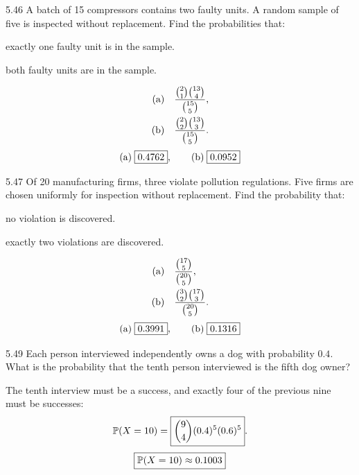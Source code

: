 \documentclass[11pt,oneside]{article}
\begin{document}
\begin{exercise}{5.46}
A batch of 15 compressors contains two faulty units. A random sample of five is inspected without replacement. Find the probabilities that:
\begin{exercisesubparts}
\item exactly one faulty unit is in the sample.
\item both faulty units are in the sample.
\end{exercisesubparts}
\end{exercise}

\begin{solution}
\begin{align*}
\textup{(a)}\quad&\frac{\binom{2}{1}\binom{13}{4}}{\binom{15}{5}},\\
\textup{(b)}\quad&\frac{\binom{2}{2}\binom{13}{3}}{\binom{15}{5}}.
\end{align*}
\[
\textup{(a)}\;\boxed{0.4762},\qquad \textup{(b)}\;\boxed{0.0952}
\]
\end{solution}

\begin{exercise}{5.47}
Of 20 manufacturing firms, three violate pollution regulations. Five firms are chosen uniformly for inspection without replacement. Find the probability that:
\begin{exercisesubparts}
\item no violation is discovered.
\item exactly two violations are discovered.
\end{exercisesubparts}
\end{exercise}

\begin{solution}
\begin{align*}
\textup{(a)}\quad&\frac{\binom{17}{5}}{\binom{20}{5}},\\
\textup{(b)}\quad&\frac{\binom{3}{2}\binom{17}{3}}{\binom{20}{5}}.
\end{align*}
\[
\textup{(a)}\;\boxed{0.3991},\qquad \textup{(b)}\;\boxed{0.1316}
\]
\end{solution}

\begin{exercise}{5.49}
Each person interviewed independently owns a dog with probability $0.4$. What is the probability that the tenth person interviewed is the fifth dog owner?
\end{exercise}

\begin{solution}
The tenth interview must be a success, and exactly four of the previous nine must be successes:
\[
\mathbb{P}(X=10)=\boxed{\binom{9}{4}(0.4)^5(0.6)^5}.
\]
\[
\boxed{\mathbb{P}(X=10)\approx 0.1003}
\]
\end{solution}
\end{document}
